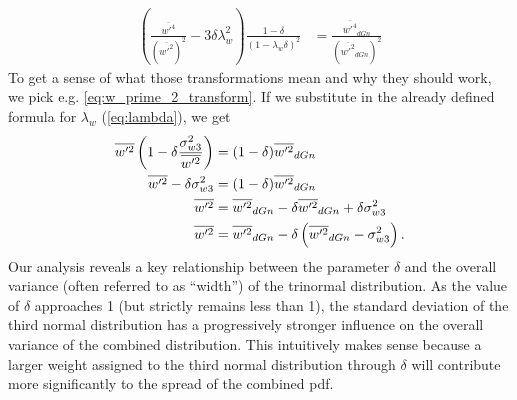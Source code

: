 \begin{align}
    \label{eq:w_prime_4_div_w_prime_2_transform}
    \left(\frac{\overline{w'^4}}{(\overline{w'^2})^2} - 3\delta\lambda_w^2 \right) \frac{1 - \delta}{(1 - \lambda_w\delta)^2}
    &= \frac{\overline{w'^4}_{dGn}}{(\overline{w'^2}_{dGn})^2}
\end{align}
To get a sense of what those transformations mean and why they should work,
we pick e.g. \cref{eq:w_prime_2_transform}.
If we substitute in the already defined formula for $\lambda_w$ (\cref{eq:lambda}), we get
\begin{align}
    \overline{w'^2} \left(1 - \delta\frac{\sigma_{w 3}^2}{\overline{w'^2}}\right)
    &= (1 - \delta)\overline{w'^2}_{dGn} \nonumber\\
    \overline{w'^2} - \delta\sigma_{w 3}^2
    &= (1 - \delta)\overline{w'^2}_{dGn} \nonumber\\
    \overline{w'^2}
    &= \overline{w'^2}_{dGn} - \delta\overline{w'^2}_{dGn} + \delta\sigma_{w 3}^2 \nonumber\\
    \overline{w'^2}
    &= \overline{w'^2}_{dGn} - \delta\left(\overline{w'^2}_{dGn} - \sigma_{w 3}^2\right).
\end{align}
Our analysis reveals a key relationship between the parameter $\delta$
and the overall variance (often referred to as \enquote{width}) of the trinormal distribution.
As the value of $\delta$ approaches 1 (but strictly remains less than 1),
the standard deviation of the third normal distribution
has a progressively stronger influence on the overall variance of the combined distribution.
This intuitively makes sense because a larger weight assigned to the third normal distribution through $\delta$
will contribute more significantly to the spread of the combined \gls{pdf}.

